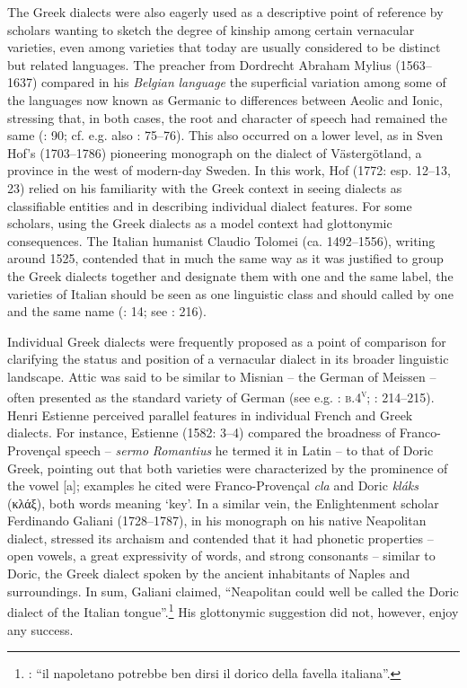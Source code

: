 The Greek dialects were also eagerly used as a descriptive point of reference by scholars wanting to sketch the degree of kinship among certain vernacular varieties, even among varieties that today are usually considered to be distinct but related languages. The preacher from Dordrecht Abraham Mylius (1563–1637) compared in his \textit{Belgian} \textit{language} the superficial variation among some of the languages now known as Germanic to differences between Aeolic and Ionic, stressing that, in both cases, the root and character of speech had remained the same (\citealt{Mylius1612}: 90; cf. e.g. also \citealt{Boxhorn1647}: 75–76). This also occurred on a lower level, as in Sven Hof’s (1703–1786) pioneering monograph on the dialect of Västergötland, a province in the west of modern-day Sweden. In this work, Hof (1772: esp. 12–13, 23) relied on his familiarity with the Greek context in seeing dialects as classifiable entities and in describing individual dialect features. For some scholars, using the Greek dialects as a model context had glottonymic consequences. The Italian humanist Claudio Tolomei (ca. 1492–1556), writing around 1525, contended that in much the same way as it was justified to group the Greek dialects together and designate them with one and the same label, the varieties of Italian should be seen as one linguistic class and should called by one and the same name (\citealt{Tolomei1555}: 14; see \citealt{Trovato1984}: 216).

Individual Greek dialects were frequently proposed as a point of comparison for clarifying the status and position of a vernacular dialect in its broader linguistic landscape. Attic was said to be similar to Misnian – the German of Meissen – often presented as the standard variety of German (see e.g. \citealt{Börner1705}: \textsc{b.4}\textsc{\textsuperscript{v}}; \citealt{Simonis1752}: 214–215). Henri Estienne perceived parallel features in individual French and Greek dialects. For instance, Estienne (1582: 3–4) compared the broadness of Franco-Provençal speech – \textit{sermo} \textit{Romantius} he termed it in Latin – to that of Doric Greek, pointing out that both varieties were characterized by the prominence of the vowel [a]; examples he cited were Franco-Provençal \textit{cla} and Doric \textit{kláks} (κλάξ), both words meaning ‘key’. In a similar vein, the Enlightenment scholar Ferdinando Galiani (1728–1787), in his monograph on his native Neapolitan dialect, stressed its archaism and contended that it had phonetic properties – open vowels, a great expressivity of words, and strong consonants – similar to Doric, the Greek dialect spoken by the ancient inhabitants of Naples and surroundings. In sum, Galiani claimed, “Neapolitan could well be called the Doric dialect of the Italian tongue”.\footnote{\citet[16]{Galiani1779}: “il napoletano potrebbe ben dirsi il dorico della favella italiana”.} His glottonymic suggestion did not, however, enjoy any success.

